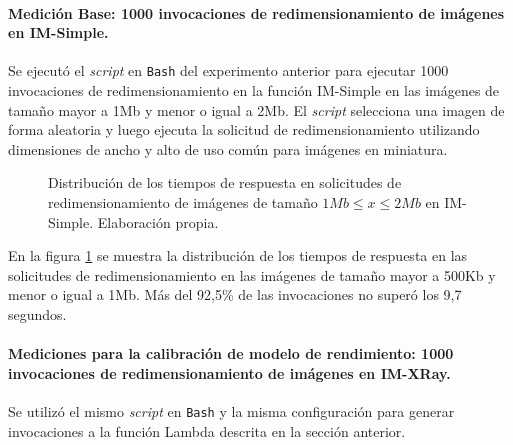 \paragraph{Medición Base: 1000 invocaciones de redimensionamiento de imágenes en IM-Simple.} 
Se ejecutó el \emph{script} en \texttt{Bash} del experimento anterior para ejecutar 1000 invocaciones de redimensionamiento en la función IM-Simple en las imágenes de tamaño mayor a 1Mb y menor o igual a 2Mb. El \emph{script} selecciona una imagen de forma aleatoria y luego ejecuta la solicitud de redimensionamiento utilizando dimensiones de ancho y alto de uso común para imágenes en miniatura.


\begin{figure}[h]
\hspace{-1.0cm}
\caption[\hspace{0.2cm} Distribución de los tiempos de respuesta en solicitudes de redimensionamiento de imágenes de tamaño $1Mb \leq x \leq 2Mb$ en IM-Simple]{Distribución de los tiempos de respuesta en solicitudes de redimensionamiento de imágenes de tamaño $1Mb \leq x \leq 2Mb$ en IM-Simple. Elaboración propia.}
\label{fig:distribucion-solicitudes-imagenes-hasta-2mb}
\end{figure}


En la figura \ref{fig:distribucion-solicitudes-imagenes-hasta-2mb} se muestra la distribución de los tiempos de respuesta en las solicitudes de redimensionamiento en las imágenes de tamaño mayor a 500Kb y menor o igual a 1Mb. Más del 92,5\% de las invocaciones no superó los 9,7 segundos.

\paragraph{Mediciones para la calibración de modelo de rendimiento: 1000 invocaciones de redimensionamiento de imágenes en IM-XRay.} Se utilizó el mismo \emph{script} en \texttt{Bash} y la misma configuración para generar invocaciones a la función Lambda descrita en la sección anterior.

